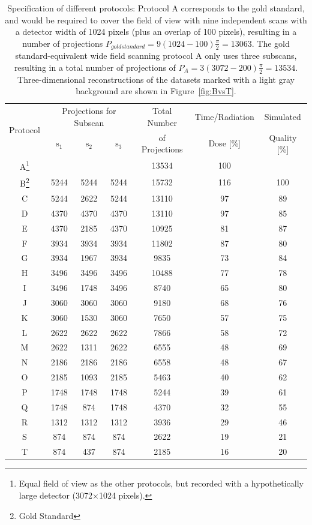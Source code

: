 \documentclass[preprint,s]{iucr}
\begin{document}
\begin{table}
	\caption{Specification of different protocols: Protocol A corresponds to the gold standard, and would be required to cover the field of view with nine independent scans with a detector width of 1024 pixels (plus an overlap of 100 pixels), resulting in a number of projections $P_{gold standard}=9(1024-100)\frac{\pi}{2}= 13063$. The gold standard-equivalent wide field scanning protocol A only uses three subscans, resulting in a total number of projections of $P_{A} = 3(3072-200)\frac{\pi}{2}= 13534$. Three-dimensional reconstructions of the datasets marked with a light gray background are shown in Figure~\ref{fig:BvsT}.}
	\label{tab:protocols}
	\begin{tabular}{ccccccc}
		\multirow{2}{*}{Protocol}   & \multicolumn{3}{c}{Projections for Subscan} & Total Number    & Time/Radiation & Simulated\\
                                    & $\textrm{s}_{1}$ & $\textrm{s}_{2}$ & $\textrm{s}_{3}$        & of Projections & Dose [\%] & Quality [\%]\\
		\hline
		A\footnote{Equal field of view as the other protocols, but recorded with a hypothetically large detector (3072$\times$1024 pixels).} & & & & 13534 & 100 & \\
		\rowcolor{lightgray} B\footnote{Gold Standard} & 5244 & 5244 & 5244 & 15732 & 116 & 100\\
		C & 5244 & 2622 & 5244 & 13110 &  97 & 89\\
		D & 4370 & 4370 & 4370 & 13110 &  97 & 85\\
		E & 4370 & 2185 & 4370 & 10925 &  81 & 87\\
		F & 3934 & 3934 & 3934 & 11802 &  87 & 80\\
		G & 3934 & 1967 & 3934 & 9835  &  73 & 84\\
		H & 3496 & 3496 & 3496 & 10488 &  77 & 78\\
		I & 3496 & 1748 & 3496 & 8740  &  65 & 80\\
		J & 3060 & 3060 & 3060 & 9180  &  68 & 76\\
		K & 3060 & 1530 & 3060 & 7650  &  57 & 75\\
		\rowcolor{lightgray} L  & 2622 & 2622 & 2622 & 7866  &  58 & 72\\
		M & 2622 & 1311 & 2622 & 6555  &  48 & 69\\
		N & 2186 & 2186 & 2186 & 6558  &  48 & 67\\
		O & 2185 & 1093 & 2185 & 5463  &  40 & 62\\
		P & 1748 & 1748 & 1748 & 5244  &  39 & 61\\
		Q & 1748 & 874  & 1748 & 4370  &  32 & 55\\
		R & 1312 & 1312 & 1312 & 3936  &  29 & 46\\
		S & 874  & 874  & 874  & 2622  &  19 & 21\\
		\rowcolor{lightgray} T & 874  & 437  & 874  & 2185  &  16  & 20\\
	\end{tabular}
\end{table}
\end{document}

